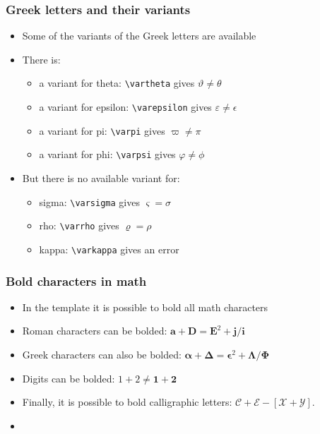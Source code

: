 \documentclass[11pt, xcolor={dvipsnames}, usepdftitle=false]{beamer}
\begin{document}
\begin{frame}
\frametitle{Greek letters and their variants}
\begin{itemize}
\item Some  of the variants of the Greek letters are available
\item There is:
\begin{itemize}
\item a variant for theta: \texttt{\textbackslash vartheta} gives $\vartheta \neq \theta$
\item a variant for epsilon: \texttt{\textbackslash varepsilon} gives $\varepsilon \neq \epsilon$
\item a variant for pi: \texttt{\textbackslash varpi} gives $\varpi \neq \pi$
\item a variant for phi: \texttt{\textbackslash varpsi} gives $\varphi \neq \phi$
\end{itemize}
\item But there is no available variant for:
\begin{itemize}
\item sigma: \texttt{\textbackslash varsigma} gives $\varsigma = \sigma$
\item rho: \texttt{\textbackslash varrho} gives $\varrho = \rho$
\item kappa: \texttt{\textbackslash varkappa} gives an error
\end{itemize}
 \end{itemize}	
\end{frame}

\begin{frame}
\frametitle{Bold characters in math}
\begin{itemize}
\item In the template it is possible to bold all math characters
\item Roman characters can be bolded: $\bm{a} + \bm{D} = \bm{E}^2 + \bm{j}/\bm{i}$
\item Greek characters can also be bolded: $\bm{\alpha} + \bm{\Delta} = \bm{\epsilon}^2 + \bm{\Lambda}/\bm{\Phi}$
\item Digits can be bolded: $1 + 2 \neq \bm{1} + \bm{2}$
\item Finally, it is possible to bold calligraphic letters: $\bm{\mathcal{C}} + \bm{\mathcal{E}} - [\bm{\mathcal{X}}+\bm{\mathcal{Y}}]$.
\item {}
\end{itemize}	
\end{frame}
\end{document}
